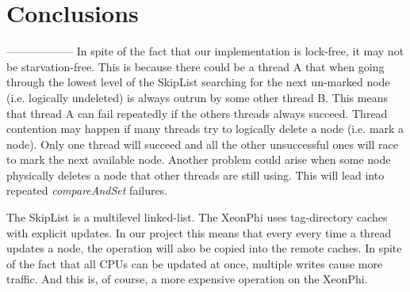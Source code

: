 \section{Conclusions}



------------------
In spite of the fact that our implementation is lock-free, it may not be starvation-free. 
This is because there could be a thread A that when going through the lowest level 
of the SkipList searching for the next un-marked node (i.e. logically undeleted) is always 
outrun by some other thread B. This means that thread A can fail repeatedly if the others
threads always succeed.
Thread contention may happen if many threads try to logically delete a node (i.e. mark
a node). Only one thread will succeed and all the other unsuccessful ones will race to mark 
the next available node. Another problem could arise when some node physically deletes a
node that other threads are still using. This will lead into repeated \textit{compareAndSet} failures.

The SkipList is a multilevel linked-list. The XeonPhi uses tag-directory caches with explicit updates. 
In our project this means that every every time a thread updates a node, the operation will also be copied 
into the remote caches. In spite of the fact that all CPUs can be updated at once, multiple writes
cause more traffic. And this is, of course, a more expensive operation on the XeonPhi.

